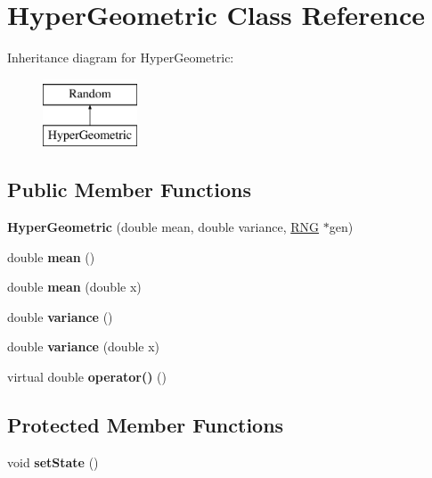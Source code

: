 \hypertarget{classHyperGeometric}{}\section{Hyper\+Geometric Class Reference}
\label{classHyperGeometric}
Inheritance diagram for Hyper\+Geometric\+:\begin{figure}[H]
\begin{center}
\leavevmode
\includegraphics[height=2.000000cm]{classHyperGeometric}
\end{center}
\end{figure}
\subsection*{Public Member Functions}
\begin{DoxyCompactItemize}
\item 
\mbox{\label{classHyperGeometric_a608e1fdb6ec6958de3f014a039c14d87}} 
{\bfseries Hyper\+Geometric} (double mean, double variance, \hyperlink{classRNG}{R\+NG} $\ast$gen)
\item 
\mbox{\label{classHyperGeometric_ac7cf633f31288ad7a25529e5788202e0}} 
double {\bfseries mean} ()
\item 
\mbox{\label{classHyperGeometric_a9cf3ed97e81c65e6a24432c679d6dadc}} 
double {\bfseries mean} (double x)
\item 
\mbox{\label{classHyperGeometric_a89d66642acfd511269ff9a0fcb41d930}} 
double {\bfseries variance} ()
\item 
\mbox{\label{classHyperGeometric_abe401bb20634053eb7cfd73acdc5da49}} 
double {\bfseries variance} (double x)
\item 
\mbox{\label{classHyperGeometric_ac591236de6a20f3cf5a810db72186110}} 
virtual double {\bfseries operator()} ()
\end{DoxyCompactItemize}
\subsection*{Protected Member Functions}
\begin{DoxyCompactItemize}
\item 
\mbox{\label{classHyperGeometric_aef3d04599132dfcb61279abf730f5aee}} 
void {\bfseries set\+State} ()
\end{DoxyCompactItemize}
